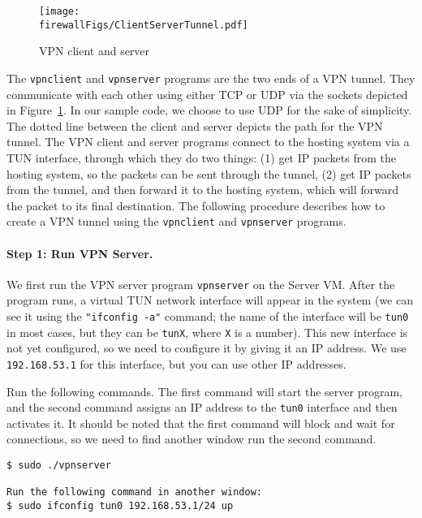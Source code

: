 \begin{figure}[htb]
\begin{center}
\texttt{[image: \\firewallFigs/ClientServerTunnel.pdf]}
\end{center}
\caption{VPN client and server}
\label{vpn_firewall:fig:client_server}
\end{figure}

The \texttt{vpnclient} and \texttt{vpnserver} programs are the two ends of
a VPN tunnel. They communicate with each other using either TCP or UDP via the sockets
depicted in Figure~\ref{vpn_firewall:fig:client_server}. In our sample code, we choose
to use UDP for the sake of simplicity.  The dotted line between the
client and server depicts the path for the VPN tunnel.
The VPN client and server programs connect to the hosting system via a
TUN interface, through which they do two things: (1) get IP packets from
the hosting system, so the packets can be sent through the tunnel, (2) get IP packets from the
tunnel, and then forward it to the hosting system, which will forward the
packet to its final destination.
The following procedure describes how to create a VPN tunnel
using the \texttt{vpnclient} and \texttt{vpnserver} programs.


\paragraph{Step 1: Run VPN Server.}
We first run the VPN server program \texttt{vpnserver} on the Server VM.
After the program runs, a virtual TUN network interface will appear
in the system (we can see it using the \texttt{"ifconfig -a"} command; the name of the
interface will be \texttt{tun0} in most cases, but they can be
\texttt{tunX}, where \texttt{X} is a number).
This new interface is not yet configured, so we need to configure it by giving it an IP
address. We use \texttt{192.168.53.1} for this interface, but you can use 
other IP addresses. 


Run the following commands. The first command will start the server
program, and the second command assigns an IP address to the \texttt{tun0}
interface and then activates it. It should be noted that the first
command will block and wait for connections,
so we need to find another window run the second command.


\begin{lstlisting}
$ sudo ./vpnserver

Run the following command in another window:
$ sudo ifconfig tun0 192.168.53.1/24 up
\end{lstlisting}

